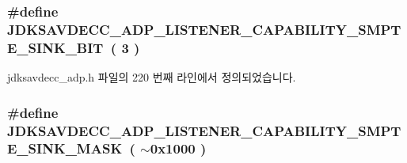 \subsubsection[{\texorpdfstring{J\+D\+K\+S\+A\+V\+D\+E\+C\+C\+\_\+\+A\+D\+P\+\_\+\+L\+I\+S\+T\+E\+N\+E\+R\+\_\+\+C\+A\+P\+A\+B\+I\+L\+I\+T\+Y\+\_\+\+S\+M\+P\+T\+E\+\_\+\+S\+I\+N\+K\+\_\+\+B\+IT}{JDKSAVDECC_ADP_LISTENER_CAPABILITY_SMPTE_SINK_BIT}}]{\setlength{\rightskip}{0pt plus 5cm}\#define J\+D\+K\+S\+A\+V\+D\+E\+C\+C\+\_\+\+A\+D\+P\+\_\+\+L\+I\+S\+T\+E\+N\+E\+R\+\_\+\+C\+A\+P\+A\+B\+I\+L\+I\+T\+Y\+\_\+\+S\+M\+P\+T\+E\+\_\+\+S\+I\+N\+K\+\_\+\+B\+IT~( 3 )}\hypertarget{group__adp__listener__capability_ga145dfa99abfbb70b8615a1da91ada06e}{}\label{group__adp__listener__capability_ga145dfa99abfbb70b8615a1da91ada06e}


jdksavdecc\+\_\+adp.\+h 파일의 220 번째 라인에서 정의되었습니다.

\subsubsection[{\texorpdfstring{J\+D\+K\+S\+A\+V\+D\+E\+C\+C\+\_\+\+A\+D\+P\+\_\+\+L\+I\+S\+T\+E\+N\+E\+R\+\_\+\+C\+A\+P\+A\+B\+I\+L\+I\+T\+Y\+\_\+\+S\+M\+P\+T\+E\+\_\+\+S\+I\+N\+K\+\_\+\+M\+A\+SK}{JDKSAVDECC_ADP_LISTENER_CAPABILITY_SMPTE_SINK_MASK}}]{\setlength{\rightskip}{0pt plus 5cm}\#define J\+D\+K\+S\+A\+V\+D\+E\+C\+C\+\_\+\+A\+D\+P\+\_\+\+L\+I\+S\+T\+E\+N\+E\+R\+\_\+\+C\+A\+P\+A\+B\+I\+L\+I\+T\+Y\+\_\+\+S\+M\+P\+T\+E\+\_\+\+S\+I\+N\+K\+\_\+\+M\+A\+SK~( $\sim$0x1000 )}\hypertarget{group__adp__listener__capability_ga3dc76c513b89d347ebb4f97339c92968}{}\label{group__adp__listener__capability_ga3dc76c513b89d347ebb4f97339c92968}


